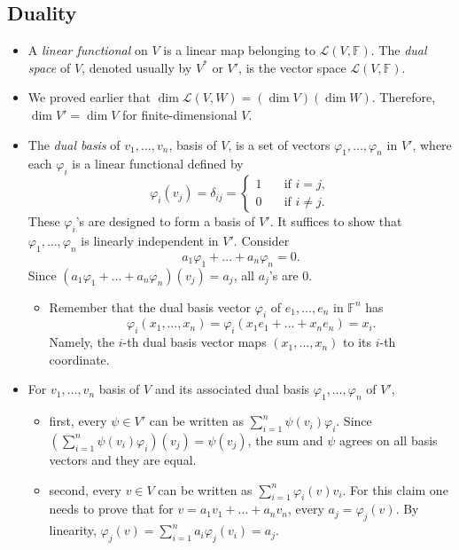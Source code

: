 \documentclass{article}
\newcommand{\F}{\mathbb{F}}
\renewcommand{\d}{\dim}
\newcommand{\LVW}{\mathcal{L}(V,W)}
\renewcommand{\phi}{\varphi}
\begin{document}
\subsection{Duality}
\begin{itemize}
    \item A \textit{linear functional} on $V$ is a linear map belonging to $\mathcal{L}(V,\F)$. The \textit{dual space} of $V$, denoted usually by $V^*$ or $V'$, is the vector space $\mathcal{L}(V,\F)$.
    \item We proved earlier that $\d \LVW = (\d V)(\d W)$. Therefore, $\d V' = \d V$ for finite-dimensional $V$.
    \item The \textit{dual basis} of $v_1,\dots,v_n$, basis of $V$, is a set of vectors $\phi_1,\dots,\phi_n$ in $V'$, where each $\phi_i$ is a linear functional defined by
    \begin{equation*}
        \phi_i(v_j) = \delta_{ij} = \left\{
            \begin{array}{rl}
                1 \quad & \text{if } i = j, \\
                0 \quad & \text{if } i \not= j.
            \end{array}
        \right.
    \end{equation*}
    These $\phi_i$'s are designed to form a basis of $V'$. It suffices to show that $\phi_1,\dots,\phi_n$ is linearly independent in $V'$. Consider $$a_1\phi_1+\dots+a_n\phi_n=0.$$ Since $(a_1\phi_1+\dots+a_n\phi_n)(v_j)=a_j$, all $a_j$'s are 0.
    \begin{itemize}
        \item Remember that the dual basis vector $\phi_i$ of $e_1,\dots,e_n$ in $\F^n$ has $$\phi_i(x_1,\dots,x_n)=\phi_i(x_1e_1+\dots+x_ne_n)=x_i.$$ Namely, the $i$-th dual basis vector maps $(x_1,\dots,x_n)$ to its $i$-th coordinate.
    \end{itemize}
    \item For $v_1,\dots,v_n$ basis of $V$ and its associated dual basis $\phi_1,\dots,\phi_n$ of $V'$, 
    \begin{itemize}
        \item first, every $\psi \in V'$ can be written as $\sum_{i=1}^n \psi(v_i)\phi_i$. Since $(\sum_{i=1}^n \psi(v_i)\phi_i)(v_j) = \psi(v_j)$, the sum and $\psi$ agrees on all basis vectors and they are equal.
        \item second, every $v \in V$ can be written as $\sum_{i=1}^n \phi_i(v)v_i$. For this claim one needs to prove that for $v = a_1v_1 + \dots +a_nv_n$, every $a_j = \phi_j(v)$. By linearity, $\phi_j(v) = \sum_{i=1}^n a_i \phi_j(v_i) = a_j$.

\end{itemize}
\end{itemize}
\end{document}
